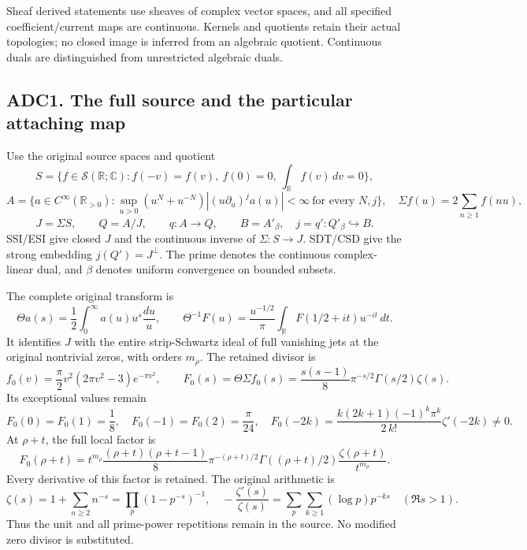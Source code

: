 Sheaf derived statements use sheaves of complex vector spaces, and all
specified coefficient/current maps are continuous. Kernels and quotients
retain their actual topologies; no closed image is inferred from an
algebraic quotient. Continuous duals are distinguished from unrestricted
algebraic duals.

\subsection{ADC1. The full source and the particular attaching
map}\label{adc1.-the-full-source-and-the-particular-attaching-map}

Use the original source spaces and quotient \[
S=\{f\in\mathcal S(\mathbb R;\mathbb C):f(-v)=f(v),\
 f(0)=0,\ \int_{\mathbb R}f(v)\,dv=0\},
\] \[
A=\{a\in C^\infty(\mathbb R_{>0}):
\sup_{u>0}(u^N+u^{-N})|(u\partial_u)^ja(u)|<\infty\
\text{for every }N,j\},\quad
\Sigma f(u)=2\sum_{n\geq1}f(nu),
\] \[
J=\Sigma S,\qquad Q=A/J,\qquad q:A\to Q,\qquad
B=A'_\beta,\quad j=q':Q'_\beta\hookrightarrow B .
\tag{ADC1.1}
\] SSI/ESI give closed \(J\) and the continuous inverse of
\(\Sigma:S\to J\). SDT/CSD give the strong embedding \(j(Q')=J^\perp\).
The prime denotes the continuous complex-linear dual, and \(\beta\)
denotes uniform convergence on bounded subsets.

The complete original transform is \[
\Theta a(s)=\frac12\int_0^\infty a(u)u^s\frac{du}{u},\qquad
\Theta^{-1}F(u)=\frac{u^{-1/2}}{\pi}
\int_{\mathbb R}F(1/2+it)u^{-it}\,dt.
\tag{ADC1.2}
\] It identifies \(J\) with the entire strip-Schwartz ideal of full
vanishing jets at the original nontrivial zeros, with orders \(m_\rho\).
The retained divisor is \[
f_0(v)=\frac{\pi}{2}v^2(2\pi v^2-3)e^{-\pi v^2},\qquad
F_0(s)=\Theta\Sigma f_0(s)
=\frac{s(s-1)}8\pi^{-s/2}\Gamma(s/2)\zeta(s).
\tag{ADC1.3}
\] Its exceptional values remain \[
F_0(0)=F_0(1)=\frac18,\quad F_0(-1)=F_0(2)=\frac{\pi}{24},
\quad
F_0(-2k)=\frac{k(2k+1)(-1)^k\pi^k}{2\,k!}\zeta'(-2k)\ne0.
\tag{ADC1.4}
\] At \(\rho+t\), the full local factor is \[
F_0(\rho+t)=t^{m_\rho}
\frac{(\rho+t)(\rho+t-1)}8\pi^{-(\rho+t)/2}
\Gamma((\rho+t)/2)\frac{\zeta(\rho+t)}{t^{m_\rho}}.
\tag{ADC1.5}
\] Every derivative of this factor is retained. The original arithmetic
is \[
\zeta(s)=1+\sum_{n\ge2}n^{-s}=\prod_p(1-p^{-s})^{-1},\quad
-\frac{\zeta'(s)}{\zeta(s)}
=\sum_p\sum_{k\ge1}(\log p)p^{-ks}\quad(\Re s>1).
\tag{ADC1.6}
\] Thus the unit and all prime-power repetitions remain in the source.
No modified zero divisor is substituted.

